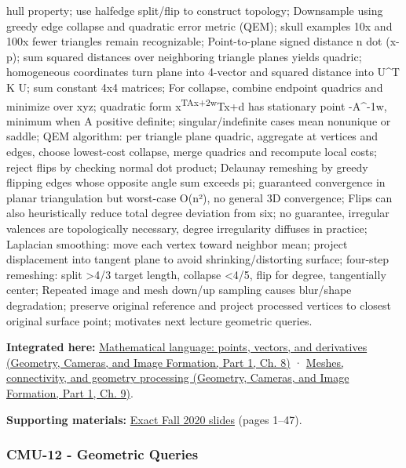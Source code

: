 hull property; use halfedge split/flip to construct topology; Downsample using greedy edge collapse and quadratic error metric (QEM); skull examples 10x and 100x fewer triangles remain recognizable; Point-to-plane signed distance n dot (x-p); sum squared distances over neighboring triangle planes yields quadric; homogeneous coordinates turn plane into 4-vector and squared distance into U\^{}T K U; sum constant 4x4 matrices; For collapse, combine endpoint quadrics and minimize over xyz; quadratic form x\textsuperscript{TAx+2w}Tx+d has stationary point -A\^{}-1w, minimum when A positive definite; singular/indefinite cases mean nonunique or saddle; QEM algorithm: per triangle plane quadric, aggregate at vertices and edges, choose lowest-cost collapse, merge quadrics and recompute local costs; reject flips by checking normal dot product; Delaunay remeshing by greedy flipping edges whose opposite angle sum exceeds pi; guaranteed convergence in planar triangulation but worst-case O(n²), no general 3D convergence; Flips can also heuristically reduce total degree deviation from six; no guarantee, irregular valences are topologically necessary, degree irregularity diffuses in practice; Laplacian smoothing: move each vertex toward neighbor mean; project displacement into tangent plane to avoid shrinking/distorting surface; four-step remeshing: split \textgreater4/3 target length, collapse \textless4/5, flip for degree, tangentially center; Repeated image and mesh down/up sampling causes blur/shape degradation; preserve original reference and project processed vertices to closest original surface point; motivates next lecture geometric queries.

\textbf{Integrated here:} \href{../03-Geometry-Cameras-and-Image-Formation-P01/main.pdf\#nameddest=03-visual-computing-i-ch001-mathematical-language-points-vectors-and-derivatives}{Mathematical language: points, vectors, and derivatives (Geometry, Cameras, and Image Formation, Part 1, Ch. 8)} · \href{../03-Geometry-Cameras-and-Image-Formation-P01/main.pdf\#nameddest=03-visual-computing-i-ch002-meshes-connectivity-and-geometry-processing}{Meshes, connectivity, and geometry processing (Geometry, Cameras, and Image Formation, Part 1, Ch. 9)}.

\textbf{Supporting materials:} \href{https://15462.courses.cs.cmu.edu/fall2020content/lectures/11_geometryprocessing/11_geometryprocessing_slides.pdf}{Exact Fall 2020 slides} (pages 1--47).

\subsubsection{CMU-12 - Geometric Queries}\label{04-visual-computing-ii-ch036-cmu-12---geometric-queries}

